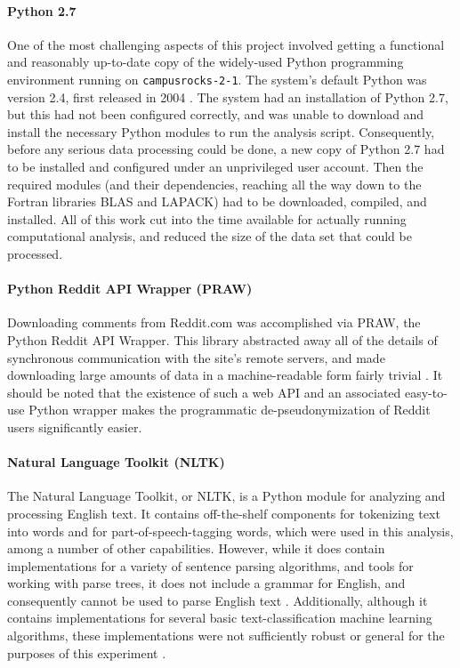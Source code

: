 \documentclass{article}
\begin{document}
\paragraph{Python 2.7}
One of the most challenging aspects of this project involved getting a functional and reasonably up-to-date copy of the widely-used Python programming environment running on \texttt{campusrocks-2-1}. The system's default Python was version 2.4, first released in 2004 \cite{python2004python}. The system had an installation of Python 2.7, but this had not been configured correctly, and was unable to download and install the necessary Python modules to run the analysis script. Consequently, before any serious data processing could be done, a new copy of Python 2.7 had to be installed and configured under an unprivileged user account. Then the required modules (and their dependencies, reaching all the way down to the Fortran libraries BLAS and LAPACK) had to be downloaded, compiled, and installed. All of this work cut into the time available for actually running computational analysis, and reduced the size of the data set that could be processed.

\paragraph{Python Reddit API Wrapper (PRAW)}
Downloading comments from Reddit.com was accomplished via PRAW, the Python Reddit API Wrapper. This library abstracted away all of the details of synchronous communication with the site's remote servers, and made downloading large amounts of data in a machine-readable form fairly trivial \cite{boe2012python}. It should be noted that the existence of such a web API and an associated easy-to-use Python wrapper makes the programmatic de-pseudonymization of Reddit users significantly easier.

\paragraph{Natural Language Toolkit (NLTK)}
The Natural Language Toolkit, or NLTK, is a Python module for analyzing and processing English text. It contains off-the-shelf components for tokenizing text into words and for part-of-speech-tagging words, which were used in this analysis, among a number of other capabilities. However, while it does contain implementations for a variety of sentence parsing algorithms, and tools for working with parse trees, it does not include a grammar for English, and consequently cannot be used to parse English text \cite{bird2006nltk}. Additionally, although it contains implementations for several basic text-classification machine learning algorithms, these implementations were not sufficiently robust or general for the purposes of this experiment \cite{nltk2012classify}.
\end{document}
